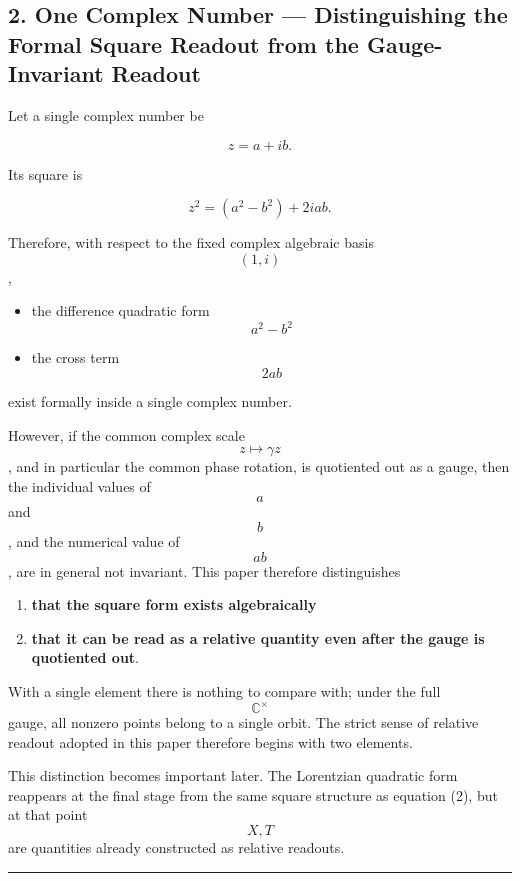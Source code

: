 \documentclass[
  a4paper,
]{article}
\providecommand{\tightlist}{%
  \setlength{\itemsep}{0pt}\setlength{\parskip}{0pt}}
\begin{document}
\subsection{2. One Complex Number --- Distinguishing the Formal Square
Readout from the Gauge-Invariant
Readout}\label{one-complex-number-distinguishing-the-formal-square-readout-from-the-gauge-invariant-readout}

Let a single complex number be

\[
z=a+ib.
\]

Its square is

\[
z^2=(a^2-b^2)+2iab.
\tag{2}
\]

Therefore, with respect to the fixed complex algebraic basis \[(1,i)\],

\begin{itemize}
\tightlist
\item
  the difference quadratic form \[a^2-b^2\]
\item
  the cross term \[2ab\]
\end{itemize}

exist formally inside a single complex number.

However, if the common complex scale \[z\mapsto\gamma z\], and in
particular the common phase rotation, is quotiented out as a gauge, then
the individual values of \[a\] and \[b\], and the numerical value of
\[ab\], are in general not invariant. This paper therefore distinguishes

\begin{enumerate}
\def\labelenumi{\arabic{enumi}.}
\tightlist
\item
  \textbf{that the square form exists algebraically}
\item
  \textbf{that it can be read as a relative quantity even after the
  gauge is quotiented out}.
\end{enumerate}

With a single element there is nothing to compare with; under the full
\[\mathbb C^\times\] gauge, all nonzero points belong to a single orbit.
The strict sense of relative readout adopted in this paper therefore
begins with two elements.

This distinction becomes important later. The Lorentzian quadratic form
reappears at the final stage from the same square structure as equation
(2), but at that point \[X,T\] are quantities already constructed as
relative readouts.

\begin{center}\rule{0.5\linewidth}{0.5pt}\end{center}
\end{document}
